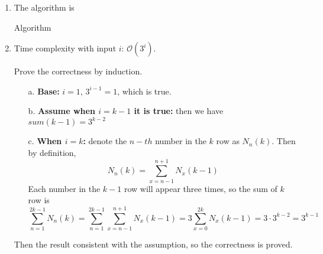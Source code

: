 \documentclass{assignment}
\begin{document}
    
    \begin{homeworkProblem} 
    \begin{enumerate}
    \item 
		The algorithm is
		
         \begin{algorithm}[H]
 \BlankLine
{}
    \caption{Algorithm} \end{algorithm}
    \item 
    Time complexity with input $i$: $\mathcal{O}(3^i)$.
    
    Prove the correctness by induction.
    \begin{enumerate}
    
    \item[a.]\textbf{Base:} $i=1$, $3^{i-1}=1$, which is true. 
    
    \item[b.]\textbf{Assume when $i=k-1$ it is true:} then we have $sum(k-1)=3^{k-2}$

\item[c.]\textbf{When $i=k$:} denote the $n-th$ number in the $k$ row as $N_n(k)$. Then by definition, 
$$N_n(k) = \sum_{x=n-1}^{n+1} N_x(k-1)$$
     Each number in the $k-1$ row will appear three times, so the sum of $k$ row is 
     $$\sum_{n=1}^{2k-1}N_n(k) = \sum_{n=1}^{2k-1} \sum_{x=n-1}^{n+1} N_x(k-1)=3\sum_{x=0}^{2k} N_x(k-1) = 3\cdot 3^{k-2} = 3^{k-1}$$
     
         \end{enumerate}

     Then the result consistent with the assumption, so the correctness is proved.
    \end{enumerate}


     \end{homeworkProblem}     
        \begin{homeworkProblem}


        
             \end{homeworkProblem}
             
\end{document}
